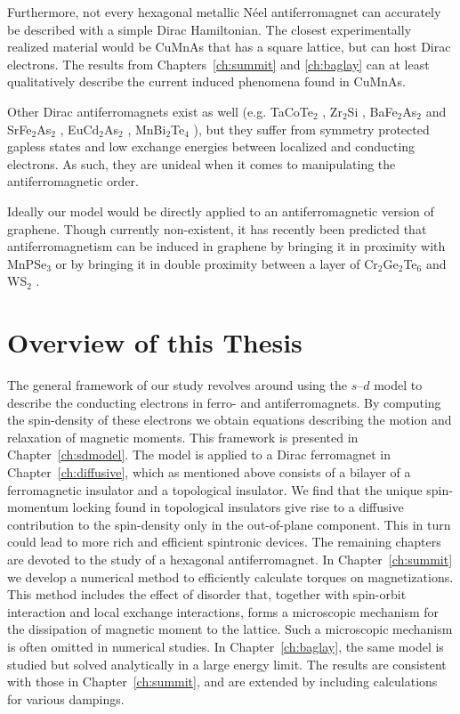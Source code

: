 Furthermore, not every hexagonal metallic N\'eel antiferromagnet can accurately be described with a simple Dirac Hamiltonian. The closest experimentally realized material would be CuMnAs that has a square lattice, but can host Dirac electrons. The results from Chapters~\ref{ch:summit} and \ref{ch:baglay} can at least qualitatively describe the current induced phenomena found in CuMnAs.

Other Dirac antiferromagnets exist as well (e.g. TaCoTe$_2$ \cite{wang_antiferromagnetic_2017}, Zr$_2$Si \cite{shao_zr2si_2018}
, BaFe$_2$As$_2$ and SrFe$_2$As$_2$ \cite{chen_two-dimensional_2017}, EuCd$_2$As$_2$ \cite{ma_emergence_2020}, MnBi$_2$Te$_4$ \cite{swatek_gapless_2020}), but they suffer from symmetry protected gapless states and low exchange energies between localized and conducting electrons. As such, they are unideal when it comes to manipulating the antiferromagnetic order. 

Ideally our model would be directly applied to an antiferromagnetic version of graphene. Though currently non-existent, it has recently been predicted that antiferromagnetism can be induced in graphene by bringing it in proximity with MnPSe$_3$ \cite{hogl_quantum_2020} or by bringing it in double proximity between a layer of Cr$_2$Ge$_2$Te$_6$ and WS$_2$ \cite{zollner_purely_2019}.

\section{Overview of this Thesis}
The general framework of our study revolves around using the $s$--$d$ model to describe the conducting electrons in ferro- and antiferromagnets. By computing the spin-density of these electrons we obtain equations describing the motion and relaxation of magnetic moments. This framework is presented in Chapter~\ref{ch:sdmodel}. The model is applied to a Dirac ferromagnet in Chapter~\ref{ch:diffusive}, which as mentioned above consists of a bilayer of a ferromagnetic insulator and a topological insulator. We find that the unique spin-momentum locking found in topological insulators give rise to a diffusive contribution to the spin-density only in the out-of-plane component. This in turn could lead to more rich and efficient spintronic devices. The remaining chapters are devoted to the study of a hexagonal antiferromagnet. In Chapter~\ref{ch:summit} we develop a numerical method to efficiently calculate torques on magnetizations. This method includes the effect of disorder that, together with spin-orbit interaction and local exchange interactions, forms a microscopic mechanism for the dissipation of magnetic moment to the lattice. Such a microscopic mechanism is often omitted in numerical studies. In Chapter~\ref{ch:baglay}, the same model is studied but solved analytically in a large energy limit. The results are consistent with those in Chapter~\ref{ch:summit}, and are extended by including calculations for various dampings. 

